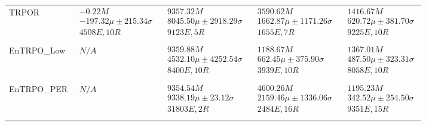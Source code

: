 \begin{tabular}{|l|p{3.2cm}|p{3.2cm}|p{3.2cm}|p{3.2cm}|}
TRPOR & $\begin{array}{c} -0.22M \\ -197.32\mu \pm 215.34\sigma \\ 4508E, 10R \end{array}$ & $\begin{array}{c} 9357.32M \\ 8045.50\mu \pm 2918.29\sigma \\ 9123E, 5R \end{array}$ & $\begin{array}{c} 3590.62M \\ 1662.87\mu \pm 1171.26\sigma \\ 1655E, 7R \end{array}$ & $\begin{array}{c} 1416.67M \\ 620.72\mu \pm 381.70\sigma \\ 9225E, 10R \end{array}$ \\ \\ \hline
EnTRPO_Low & $\begin{array}{c} N/A \end{array}$ & $\begin{array}{c} 9359.88M \\ 4532.10\mu \pm 4252.54\sigma \\ 8400E, 10R \end{array}$ & $\begin{array}{c} 1188.67M \\ 662.45\mu \pm 375.90\sigma \\ 3939E, 10R \end{array}$ & $\begin{array}{c} 1367.01M \\ 487.50\mu \pm 323.31\sigma \\ 8058E, 10R \end{array}$ \\ \\ \hline
EnTRPO_PER & $\begin{array}{c} N/A \end{array}$ & $\begin{array}{c} 9354.54M \\ 9338.19\mu \pm 23.12\sigma \\ 31803E, 2R \end{array}$ & $\begin{array}{c} 4600.26M \\ 2159.46\mu \pm 1336.06\sigma \\ 2484E, 16R \end{array}$ & $\begin{array}{c} 1195.23M \\ 342.52\mu \pm 254.50\sigma \\ 9351E, 15R \end{array}$ \\ \\ \hline

\end{tabular}
